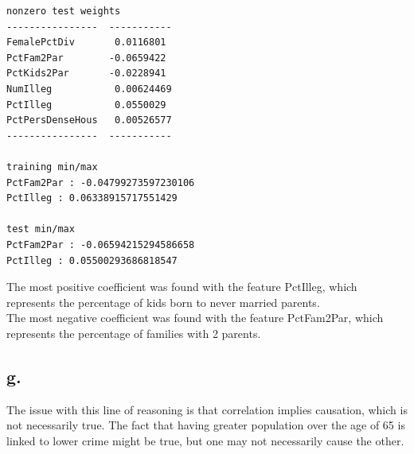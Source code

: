 \documentclass{article}
\newcommand{\1}{\mathbf{1}}
\begin{document}
{\begin{verbatim}
nonzero test weights
----------------  -----------
FemalePctDiv       0.0116801
PctFam2Par        -0.0659422
PctKids2Par       -0.0228941
NumIlleg           0.00624469
PctIlleg           0.0550029
PctPersDenseHous   0.00526577
----------------  -----------

training min/max
PctFam2Par : -0.04799273597230106
PctIlleg : 0.06338915717551429

test min/max
PctFam2Par : -0.06594215294586658
PctIlleg : 0.05500293686818547

\end{verbatim}

The most positive coefficient was found with the feature PctIlleg, which represents the percentage of kids born to never married parents. \\
The most negative coefficient was found with the feature PctFam2Par, which represents the percentage of families with 2 parents.

\subsection*{g.}

The issue with this line of reasoning is that correlation implies causation, which is not necessarily true. The fact that having greater population over the age of 65 is linked to lower crime might be true, but one may not necessarily cause the other. 

}
\end{document}

